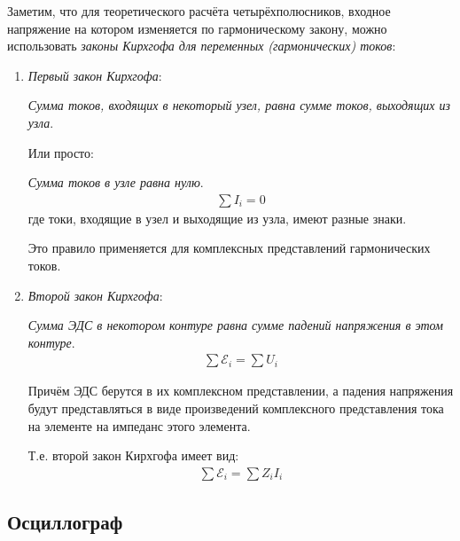 \documentclass[a4paper, usenames, dvipsnames]{article}
\begin{document}
Заметим, что для теоретического расчёта четырёхполюсников,
входное напряжение на котором изменяется по гармоническому закону,
можно использовать {\it законы Кирхгофа для переменных (гармонических) токов}:
\begin{enumerate}
    \item {\it Первый закон Кирхгофа}:

          {\it Сумма токов, входящих в некоторый узел,
          равна сумме токов, выходящих из узла}.

          Или просто:

          {\it Сумма токов в узле равна нулю}.
          \begin{gather*}
              \sum I_i = 0
          \end{gather*}
          где токи, входящие в узел и выходящие из узла, имеют разные знаки.

          Это правило применяется для комплексных представлений гармонических токов.
    \item {\it Второй закон Кирхгофа}:

          {\it Сумма ЭДС в некотором контуре равна
          сумме падений напряжения в этом контуре}.
          \begin{gather*}
              \sum \mathcal{E}_i = \sum U_i
          \end{gather*}

          Причём ЭДС берутся в их комплексном представлении,
          а падения напряжения будут представляться в виде
          произведений комплексного представления тока на элементе
          на импеданс этого элемента.

          Т.е. второй закон Кирхгофа имеет вид:
          \begin{gather*}
              \sum \mathcal{E}_i = \sum Z_i I_i
          \end{gather*}
\end{enumerate}

\subsection*{Осциллограф}
\end{document}
